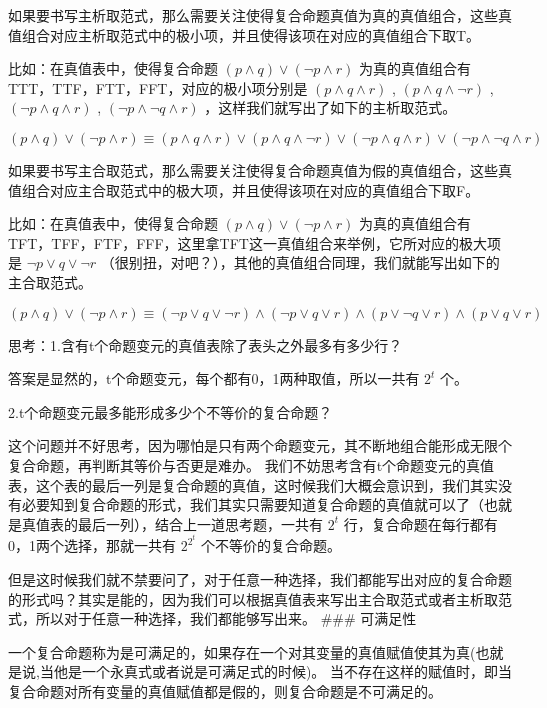 \documentclass[12pt,a4paper,oneside]{ctexart}
\begin{document}
如果要书写主析取范式，那么需要关注使得复合命题真值为真的真值组合，这些真值组合对应主析取范式中的极小项，并且使得该项在对应的真值组合下取T。

比如：在真值表中，使得复合命题 \((p\wedge q)\vee(\neg p\wedge r)\) 为真的真值组合有TTT，TTF，FTT，FFT，对应的极小项分别是 \((p\wedge q\wedge r)\) , \((p\wedge q\wedge\neg r)\) , \((\neg p\wedge q\wedge r)\) , \((\neg p\wedge\neg q\wedge r)\) ，这样我们就写出了如下的主析取范式。

\[(p\wedge q)\vee(\neg p\wedge r)\equiv (p\wedge q\wedge r)\vee(p\wedge q\wedge\neg r)\vee(\neg p\wedge q\wedge r)\vee(\neg p\wedge\neg q\wedge r)\]

如果要书写主合取范式，那么需要关注使得复合命题真值为假的真值组合，这些真值组合对应主合取范式中的极大项，并且使得该项在对应的真值组合下取F。

比如：在真值表中，使得复合命题 \((p\wedge q)\vee(\neg p\wedge r)\) 为真的真值组合有TFT，TFF，FTF，FFF，这里拿TFT这一真值组合来举例，它所对应的极大项是 \(\neg p\vee q\vee\neg r\) （很别扭，对吧？），其他的真值组合同理，我们就能写出如下的主合取范式。

\[(p\wedge q)\vee(\neg p\wedge r)\equiv (\neg p\vee q\vee\neg r)\wedge(\neg p\vee q\vee r)\wedge(p\vee\neg q\vee r)\wedge(p\vee q\vee r)\]

思考：1.含有t个命题变元的真值表除了表头之外最多有多少行？

答案是显然的，t个命题变元，每个都有0，1两种取值，所以一共有 \(2^t\) 个。

2.t个命题变元最多能形成多少个不等价的复合命题？

这个问题并不好思考，因为哪怕是只有两个命题变元，其不断地组合能形成无限个复合命题，再判断其等价与否更是难办。 我们不妨思考含有t个命题变元的真值表，这个表的最后一列是复合命题的真值，这时候我们大概会意识到，我们其实没有必要知到复合命题的形式，我们其实只需要知道复合命题的真值就可以了（也就是真值表的最后一列），结合上一道思考题，一共有 \(2^t\) 行，复合命题在每行都有0，1两个选择，那就一共有 \(2^{2^t}\) 个不等价的复合命题。

但是这时候我们就不禁要问了，对于任意一种选择，我们都能写出对应的复合命题的形式吗？其实是能的，因为我们可以根据真值表来写出主合取范式或者主析取范式，所以对于任意一种选择，我们都能够写出来。 \#\#\# 可满足性

一个复合命题称为是可满足的，如果存在一个对其变量的真值赋值使其为真(也就是说,当他是一个永真式或者说是可满足式的时候)。 当不存在这样的赋值时，即当复合命题对所有变量的真值赋值都是假的，则复合命题是不可满足的。
\end{document}
